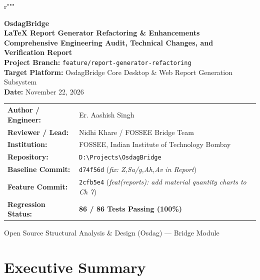 r"""\documentclass[11pt,a4paper]{article}
\begin{document}
\begin{titlepage}
\vspace*{1.5cm}
\begin{center}
    {\Huge \bfseries\color{osdagDarkGreen} OsdagBridge}\\[0.4cm]
    {\LARGE \bfseries LaTeX Report Generator Refactoring \& Enhancements}\\[0.8cm]
    {\large \bfseries Comprehensive Engineering Audit, Technical Changes, and Verification Report}\\[2.0cm]
    
    \textbf{Project Branch:} \texttt{feature/report-generator-refactoring}\\[0.2cm]
    \textbf{Target Platform:} OsdagBridge Core Desktop \& Web Report Generation Subsystem\\[0.2cm]
    \textbf{Date:} November 22, 2026\\[2.5cm]

    \begin{tabular}{ll}
        \textbf{Author / Engineer:} & Er. Aashish Singh \\
        \textbf{Reviewer / Lead:} & Nidhi Khare / FOSSEE Bridge Team \\
        \textbf{Institution:} & FOSSEE, Indian Institute of Technology Bombay \\
        \textbf{Repository:} & \texttt{D:\textbackslash Projects\textbackslash OsdagBridge} \\
        \textbf{Baseline Commit:} & \texttt{d74f56d} (\textit{fix: Z,Sa/g,Ah,Av in Report}) \\
        \textbf{Feature Commit:} & \texttt{2cfb5e4} (\textit{feat(reports): add material quantity charts to Ch 7}) \\
        \textbf{Regression Status:} & \textbf{86 / 86 Tests Passing (100\%)} \\
    \end{tabular}
    
    \vfill
    {\small \color{gray} Open Source Structural Analysis \& Design (Osdag) --- Bridge Module}
\end{center}
\end{titlepage}

\tableofcontents
\newpage

\section{Executive Summary}
\end{document}
